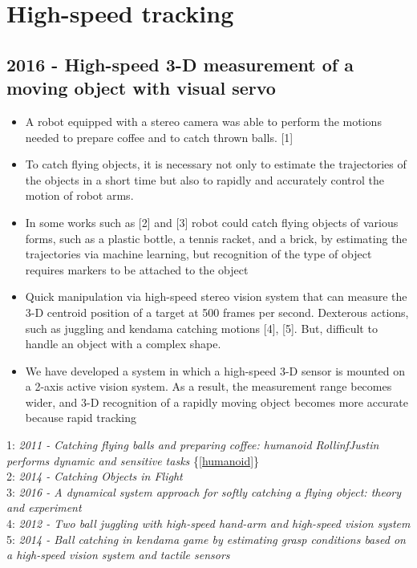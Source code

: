 \section{High-speed tracking}
\subsection{2016 - High-speed 3-D measurement of a moving object with visual servo}
\begin{itemize}
\item A robot equipped with a stereo camera was able to perform the motions needed to prepare coffee and to catch thrown balls. [1]
\item To catch flying objects, it is necessary not only to estimate the trajectories of the objects in a short time but also to rapidly and accurately control the motion of robot arms.
\item In some works such as [2] and [3] robot could catch flying objects of various forms, such as a plastic bottle, a tennis racket, and a brick, by estimating the trajectories via machine learning, but recognition of the type of object requires markers to be attached to the object
\item Quick manipulation via high-speed stereo vision system that can measure the 3-D centroid position of a target at 500 frames per second. Dexterous actions, such as juggling and kendama catching motions [4], [5]. But, difficult to handle an object with a complex shape.
\item  We have developed a system in which a high-speed 3-D sensor is mounted on a 2-axis active vision system. As a result, the measurement range becomes wider, and 3-D recognition of a
rapidly moving object becomes more accurate because rapid
tracking
\end{itemize}
1: \textit{2011 -  Catching flying balls and preparing coffee: humanoid RollinfJustin performs dynamic and sensitive tasks} \{\ref{humanoid}\} \\
2: \textit{2014 -  Catching Objects in Flight} \\
3: \textit{2016 - A dynamical system
approach for softly catching a flying object: theory and experiment} \\
4: \textit{2012 - Two ball
juggling with high-speed hand-arm and high-speed vision system} \\
5: \textit{2014 - Ball catching in kendama game by estimating
grasp conditions based on a high-speed vision system and tactile
sensors}

